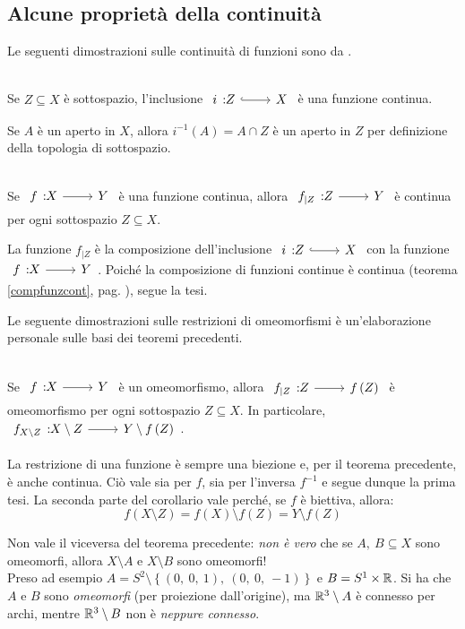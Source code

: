 \subsection{Alcune proprietà della continuità}
Le seguenti dimostrazioni sulle continuità di funzioni sono da \cite{munkres:2000topology}.
\begin{theorema}~{}\\
	Se $Z\subseteq X$ è sottospazio, l'inclusione $\incl{i}{Z}{X}$ è una funzione continua.
\end{theorema}
\begin{demonstration}
	Se $A$ è un aperto in $X$, allora $i^{-1}\left(A\right)=A\cap Z$ è un aperto in $Z$ per definizione della topologia di sottospazio.
\end{demonstration}
\begin{theorema}~{}\\
	Se $\funz{f}{X}{Y}$ è una funzione continua, allora $\funz{f_{\mid Z}}{Z}{Y}$ è continua per ogni sottospazio $Z\subseteq X$.
\end{theorema}
\begin{demonstration}
	La funzione $f_{\mid Z}$ è la composizione dell'inclusione $\incl{i}{Z}{X}$ con la funzione $\funz{f}{X}{Y}$. Poiché la composizione di funzioni continue è continua (teorema \ref{compfunzcont}, pag. \pageref{compfunzcont}), segue la tesi.
\end{demonstration}
Le seguente dimostrazioni sulle restrizioni di omeomorfismi è un'elaborazione personale sulle basi dei teoremi precedenti.
\begin{corollary}~{}\\
Se $\funz{f}{X}{Y}$ è un omeomorfismo, allora $\funz{f_{\mid Z}}{Z}{f\left(Z\right)}$ è omeomorfismo per ogni sottospazio $Z\subseteq X$. In particolare, $\funz{f_{X\setminus Z}}{X\setminus Z}{Y\setminus f\left(Z\right)}$.
\end{corollary}
\begin{demonstration}
	La restrizione di una funzione è sempre una biezione e, per il teorema precedente, è anche continua. Ciò vale sia per $f$, sia per l'inversa $f^{-1}$ e segue dunque la prima tesi. La seconda parte del corollario vale perché, se $f$ è biettiva, allora:
	\begin{equation*}
		f\left(X\setminus Z\right)=f\left(X\right)\setminus f\left(Z\right)=Y\setminus f\left(Z\right)
	\end{equation*}
\vspace{-3mm}
\end{demonstration}
\begin{attention}
	Non vale il viceversa del teorema precedente: \textit{non è vero} che se $A,\ B\subseteq X$ sono omeomorfi, allora $X\setminus A$ e $X\setminus B$ sono omeomorfi!\\
	Preso ad esempio $A=S^2\setminus\left\{(0,\ 0,\ 1),\ (0,\ 0,\ -1)\right\}$ e $B=S^1\times \mathbb{R}$. Si ha che $A$ e $B$ sono \textit{omeomorfi} (per proiezione dall'origine), ma $\mathbb{R}^3\setminus A$ è connesso per archi, mentre $\mathbb{R}^3\setminus B$ non è \textit{neppure connesso}.
\end{attention} 
